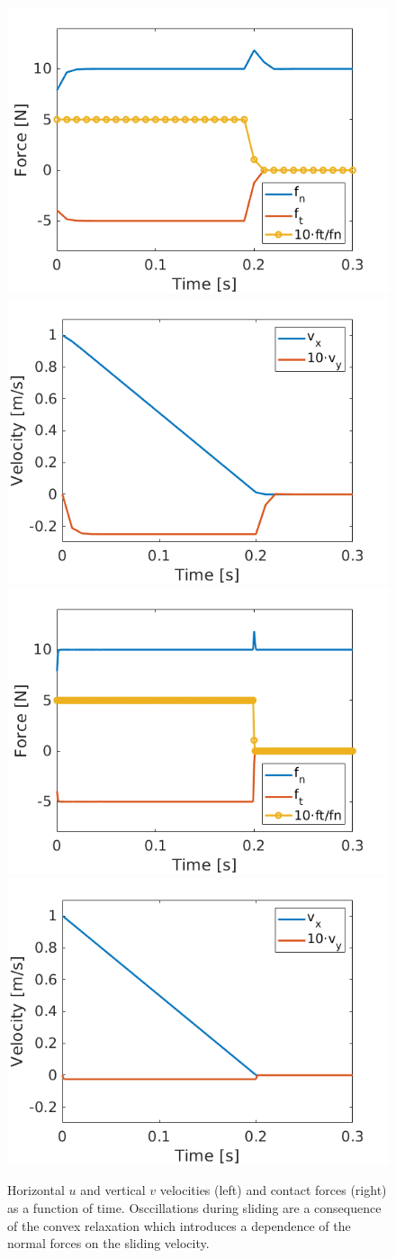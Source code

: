 \begin{figure}[!h]
	\centering
	\includegraphics[width=0.45\columnwidth]{figures/sliding_box/forces_h1em2_phi0.png}
    \includegraphics[width=0.45\columnwidth]{figures/sliding_box/velocities_h1em2_phi0.png}\\
    \includegraphics[width=0.45\columnwidth]{figures/sliding_box/forces_h1em3_phi0.png}
    \includegraphics[width=0.45\columnwidth]{figures/sliding_box/velocities_h1em3_phi0.png}\\
	\caption{\label{fig:sliding_box_phi0} 
	Horizontal $u$ and vertical $v$ velocities (left) and contact forces (right)
	as a function of time. Osccillations during sliding are a consequence of the
	convex relaxation which introduces a dependence of the normal forces on the
	sliding velocity.}
\end{figure}

